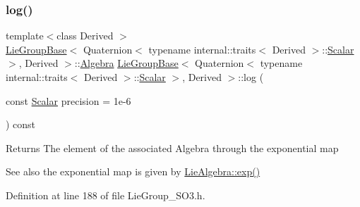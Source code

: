 \subsubsection{\texorpdfstring{log()}{log()}}
{\footnotesize\ttfamily template$<$class Derived $>$ \\
\hyperlink{class_lie_group_base}{Lie\+Group\+Base}$<$ Quaternion$<$ typename internal\+::traits$<$ Derived $>$\+::\hyperlink{class_lie_group_base_3_01_quaternion_3_01typename_01internal_1_1traits_3_01_derived_01_4_1_1_scalar_01_4_00_01_derived_01_4_afadeceb3b98e52deecc572e71efb82a8}{Scalar} $>$, Derived $>$\+::\hyperlink{class_lie_group_base_3_01_quaternion_3_01typename_01internal_1_1traits_3_01_derived_01_4_1_1_scalar_01_4_00_01_derived_01_4_a0a25a28e133c962ab8524a766ae6a01c}{Algebra} \hyperlink{class_lie_group_base}{Lie\+Group\+Base}$<$ Quaternion$<$ typename internal\+::traits$<$ Derived $>$\+::\hyperlink{class_lie_group_base_3_01_quaternion_3_01typename_01internal_1_1traits_3_01_derived_01_4_1_1_scalar_01_4_00_01_derived_01_4_afadeceb3b98e52deecc572e71efb82a8}{Scalar} $>$, Derived $>$\+::log (\begin{DoxyParamCaption}\item[{const \hyperlink{class_lie_group_base_3_01_quaternion_3_01typename_01internal_1_1traits_3_01_derived_01_4_1_1_scalar_01_4_00_01_derived_01_4_afadeceb3b98e52deecc572e71efb82a8}{Scalar}}]{precision = {\ttfamily 1e-\/6} }\end{DoxyParamCaption}) const}

\begin{DoxyReturn}{Returns}
The element of the associated Algebra through the exponential map 
\end{DoxyReturn}
\begin{DoxySeeAlso}{See also}
the exponential map is given by \hyperlink{class_lie_algebra_base_aafe7d43a29d43aed54dd91b3a3a4c9f7}{Lie\+Algebra\+::exp()} 
\end{DoxySeeAlso}


Definition at line 188 of file Lie\+Group\+\_\+\+S\+O3.\+h.

\hypertarget{class_lie_group_base_3_01_quaternion_3_01typename_01internal_1_1traits_3_01_derived_01_4_1_1_scalar_01_4_00_01_derived_01_4_ae0f90a992d5c96f69839a1f77bf95299}{}\label{class_lie_group_base_3_01_quaternion_3_01typename_01internal_1_1traits_3_01_derived_01_4_1_1_scalar_01_4_00_01_derived_01_4_ae0f90a992d5c96f69839a1f77bf95299} 

